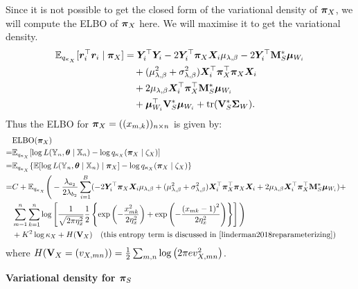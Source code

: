 \documentclass[numsec,webpdf,modern,medium,namedate]{oup-authoring-template}
\theoremstyle{thmstyleone}%
\theoremstyle{thmstyletwo}%
\theoremstyle{thmstylethree}%
\begin{document}
Since it is not possible to get the closed form of the variational density of $\boldsymbol{\pi}_X$, we will compute the ELBO of $\boldsymbol{\pi}_X$ here. We will maximise it to get the variational density.
\begin{align*}
\mathbb{E}_{q_{\kappa_X}}[\boldsymbol{r}_i^\top \boldsymbol{r}_i\mid\boldsymbol{\pi}_X] &=  \boldsymbol{Y}_i^\top \boldsymbol{Y}_i - 2 \boldsymbol{Y}_i^\top \boldsymbol{\pi}_X \boldsymbol{X}_i \mu_{\lambda, \beta} - 2 \boldsymbol{Y}_i^\top {\mathbf{M}^\ast_S} \boldsymbol{\mu}_{W_i} \\
&\quad + (\mu_{\lambda, \beta}^2 + \sigma^2_{\lambda, \beta}) \boldsymbol{X}_i^\top \boldsymbol{\pi}_X^\top \boldsymbol{\pi}_X \boldsymbol{X}_i \\
&\quad + 2 \mu_{\lambda, \beta} \boldsymbol{X}_i^\top \boldsymbol{\pi}_X^\top \mathbf{M}^\ast_S {\boldsymbol{\mu}_{W_i}} \\
&\quad + {\boldsymbol{\mu}_{W_i}^\top \mathbf{V}_S^\ast \boldsymbol{\mu}_{W_i} + \mathrm{tr}(\mathbf{V}_S^\ast\boldsymbol{\Sigma}_W)}.
\end{align*}
Thus the ELBO for $\boldsymbol{\pi}_X = ((x_{m,k}))_{n \times n}$ is given by:
{\small
\begin{align*}
& \text{ELBO}(\boldsymbol{\pi}_X)\\
= & \mathbb{E}_{q_{\kappa_X}}[\log L(\mathbb{Y}_n,\boldsymbol{\theta}\mid\mathbb{X}_n) - \log q_{\kappa_X}(\boldsymbol{\pi}_X \mid \zeta_X)] & \\
= & \mathbb{E}_{q_{\kappa_X}}\{\mathbb{E}[\log L(\mathbb{Y}_n,\boldsymbol{\theta}\mid\mathbb{X}_n)\mid\boldsymbol{\pi}_X] - \log q_{\kappa_X}(\boldsymbol{\pi}_X \mid \zeta_X)\}\\
=  & C + \mathbb{E}_{q_{\kappa_X}}\Bigg(-\frac{\lambda_{a_2}}{2\lambda_{b_2}} \sum_{i = 1}^B (-2 \boldsymbol{Y}_i^\top \boldsymbol{\pi}_X \boldsymbol{X}_i \mu_{\lambda, \beta} + (\mu_{\lambda, \beta}^2 + \sigma^2_{\lambda, \beta}) \boldsymbol{X}_i^\top \boldsymbol{\pi}_X^\top \boldsymbol{\pi}_X \boldsymbol{X}_i + 2 \mu_{\lambda, \beta} \boldsymbol{X}_i^\top \boldsymbol{\pi}_X^\top \mathbf{M}^\ast_S \boldsymbol{\mu}_{W_i}) +\\
& \sum_{m=1}^n\sum_{k=1}^n \log \left[\frac{1}{\sqrt{2 \pi \eta^2_x}}\frac{1}{2}\left\{\exp \left(-\frac{x_{m k}^2}{2 \eta_x^2}\right)+\exp \left(-\frac{\left(x_{m k} - 1\right)^2}{2 \eta_x^2}\right)\right\}\right]\Bigg)  \\
& + K^2 \log \kappa_X + H(\mathbf{V}_X) \quad \text{(this entropy term is discussed in \cite{linderman2018reparameterizing})}
\end{align*}}
where $H(\mathbf{V}_X = (v_{X,mn})) = 
\frac{1}{2} \sum_{m,n} \log \left(2\pi e v^2_{X,mn}\right)$.

\textbf{Variational density for $\boldsymbol{\pi}_S$}
\end{document}
